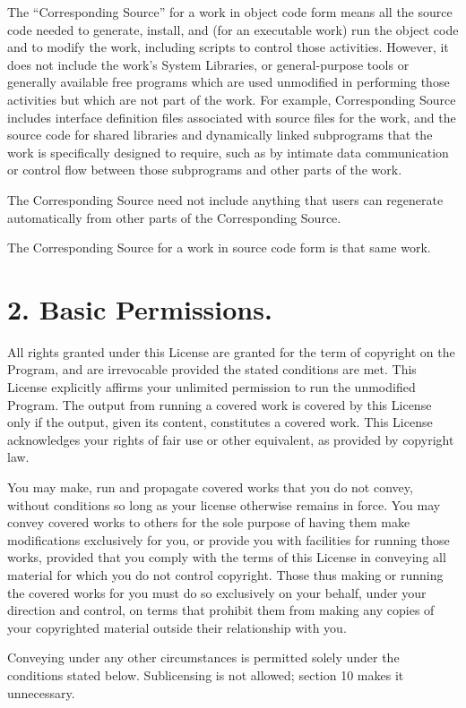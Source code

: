 \documentclass[11pt,a4paper]{article}
\begin{document}
The “Corresponding Source” for a work in object code form means all the
source code needed to generate, install, and (for an executable work)
run the object code and to modify the work, including scripts to control
those activities. However, it does not include the work's System
Libraries, or general-purpose tools or generally available free programs
which are used unmodified in performing those activities but which are
not part of the work. For example, Corresponding Source includes
interface definition files associated with source files for the work,
and the source code for shared libraries and dynamically linked
subprograms that the work is specifically designed to require, such as
by intimate data communication or control flow between those subprograms
and other parts of the work.

The Corresponding Source need not include anything that users can
regenerate automatically from other parts of the Corresponding Source.

The Corresponding Source for a work in source code form is that same
work.

\part*{2. Basic Permissions.}

All rights granted under this License are granted for the term of
copyright on the Program, and are irrevocable provided the stated
conditions are met. This License explicitly affirms your unlimited
permission to run the unmodified Program. The output from running a
covered work is covered by this License only if the output, given its
content, constitutes a covered work. This License acknowledges your
rights of fair use or other equivalent, as provided by copyright law.

You may make, run and propagate covered works that you do not convey,
without conditions so long as your license otherwise remains in force.
You may convey covered works to others for the sole purpose of having
them make modifications exclusively for you, or provide you with
facilities for running those works, provided that you comply with the
terms of this License in conveying all material for which you do not
control copyright. Those thus making or running the covered works for
you must do so exclusively on your behalf, under your direction and
control, on terms that prohibit them from making any copies of your
copyrighted material outside their relationship with you.

Conveying under any other circumstances is permitted solely under the
conditions stated below. Sublicensing is not allowed; section 10 makes
it unnecessary.
\end{document}
